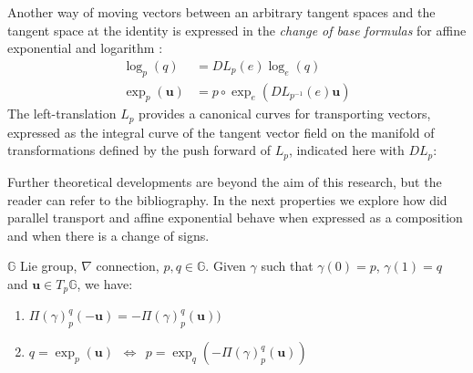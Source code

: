 Another way of moving vectors between an arbitrary tangent spaces and the tangent space at the identity is expressed in the \emph{change of base formulas} for affine exponential and logarithm \cite{arsigny2006bi}:
\begin{align}\label{eq:DL_DR}
\log _{p}(q)  &= DL_{p}(e) \log _{e}(q)  \\
\exp _{p}(\mathbf{u})  &= p\circ \exp_{e} (DL_{p^{-1}}(e) \mathbf{u})
\end{align}
The left-translation $L_{p}$ provides a canonical curves for transporting vectors, expressed as the integral curve of the tangent vector field on the manifold of transformations defined by the push forward of $L_{p}$, indicated here with $DL_{p}$:

Further theoretical developments are beyond the aim of this research, but the reader can refer to the bibliography.
In the next properties we explore how did parallel transport and affine exponential behave when expressed as a composition and when there is a change of signs.
\begin{prop}[Inversion]
	$\mathbb{G}$ Lie group, $\nabla$ connection, $p,q\in\mathbb{G}$. Given $\gamma$ such that $\gamma(0)= p$, $\gamma(1)=q$ and $\mathbf{u}\in T_{p}\mathbb{G}$, we have:
	\begin{enumerate}
	\item $\Pi(\gamma)_{p}^{q}(-\mathbf{u}) = -\Pi(\gamma)_{p}^{q}(\mathbf{u}) )$
	\item $q = \exp_{p}(\mathbf{u}) \phantom{z} \Longleftrightarrow \phantom{z} p = \exp_{q}(-\Pi(\gamma)_{p}^{q}(\mathbf{u}))$
	\end{enumerate}
\end{prop}
